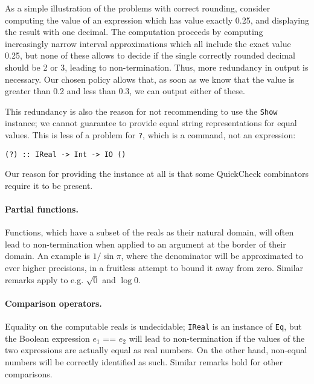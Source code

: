 \documentclass[9pt, a4, twocolumn]{article}
\begin{document}
As a simple illustration of the problems with correct rounding,
consider computing  the value of an expression which has value exactly 0.25, and displaying
the result with one decimal. The computation proceeds by computing increasingly narrow
interval approximations which all include the exact value 0.25, but none
of these allows to decide if the 
single correctly rounded decimal should be 2 or 3, leading to non-termination. Thus, more redundancy in output is
necessary. Our chosen policy allows that, as soon as we know that the value is
greater than 0.2 and less than 0.3, we can output either of these.

This redundancy is also the reason for not recommending to use the \texttt{Show}
instance; we cannot guarantee to provide equal string representations
for equal values. This is less of a problem for \texttt{?}, which is a
command, not an expression:
\begin{verbatim}
(?) :: IReal -> Int -> IO ()
\end{verbatim}
Our reason for providing the instance at all is that some QuickCheck
combinators require it to be present.

\paragraph{Partial functions.} Functions, which have a  subset of the
reals as their natural domain, will often lead to non-termination when applied to an
argument at the border of their domain. An example is $1/\sin \pi$,
where the denominator will be approximated to ever higher precisions,
in a fruitless attempt to bound it away from zero. Similar remarks apply
to e.g.  $\sqrt 0$ and $\log 0$.

\paragraph{Comparison operators.} Equality on the computable reals is
undecidable; \texttt{IReal} is an instance of \texttt{Eq}, but the Boolean expression $e_1$ == $e_2$ will lead to
non-termination if the values of the two expressions are actually
equal as real numbers. On the other hand, non-equal numbers will be 
correctly identified as such. Similar remarks hold for other
comparisons. 
\end{document}
